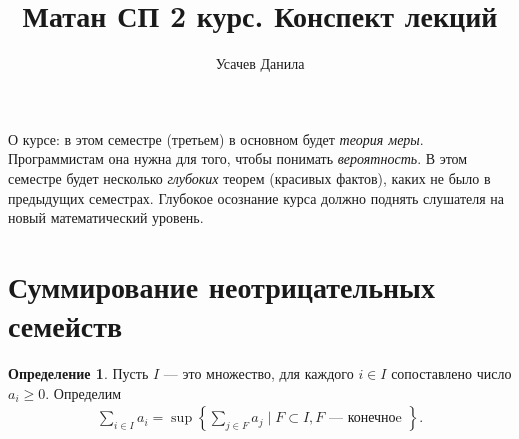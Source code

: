 \documentclass[a4paper,14pt]{extarticle}
\title{Матан СП 2 курс. Конспект лекций}
\author{Усачев Данила}
\newcounter{theoremCnt}
\theoremstyle{definition}
\newtheorem{df}[theoremCnt]{Определение}
\theoremstyle{plain}
\theoremstyle{plain}
\theoremstyle{plain}
\theoremstyle{plain}
\theoremstyle{definition}
\theoremstyle{definition}
\theoremstyle{definition}
\theoremstyle{definition}
\theoremstyle{definition}
\theoremstyle{definition}
\theoremstyle{plain}
\theoremstyle{plain}
\theoremstyle{plain}
\theoremstyle{plain}
\theoremstyle{definition}
\theoremstyle{definition}
\theoremstyle{definition}
\theoremstyle{definition}
\theoremstyle{definition}
\begin{document}
\maketitle
\newpage

О курсе: в этом семестре (третьем) в основном будет \textit{теория меры}. Программистам она нужна для того, чтобы понимать \textit{вероятность}. В этом семестре будет несколько \textit{глубоких} теорем (красивых фактов), каких не было в предыдущих семестрах. Глубокое осознание курса должно поднять слушателя на новый математический уровень.

\section{Суммирование неотрицательных семейств}

\begin{df}
 Пусть $ I $ --- это множество, для каждого $ i \in I $ сопоставлено число $ a_i \geqslant 0 $. Определим
 \begin{align*}
  \sum_{i \in I} a_i = \sup \left\{ \sum_{j \in F} a_j \mid F \subset I, F \text{ --- конечноe }\right\}
 .\end{align*}
\end{df}
\end{document}
